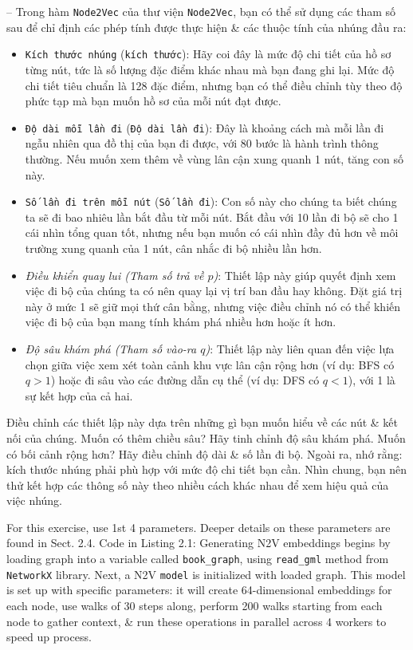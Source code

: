 \documentclass{article}
\begin{document}
\begin{itemize}
\begin{itemize}
\begin{itemize}
           -- Trong hàm {\tt Node2Vec} của thư viện {\tt Node2Vec}, bạn có thể sử dụng các tham số sau để chỉ định các phép tính được thực hiện \& các thuộc tính của nhúng đầu ra:
           \begin{itemize}
               \item {\tt Kích thước nhúng} ({\tt kích thước}): Hãy coi đây là mức độ chi tiết của hồ sơ từng nút, tức là số lượng đặc điểm khác nhau mà bạn đang ghi lại. Mức độ chi tiết tiêu chuẩn là 128 đặc điểm, nhưng bạn có thể điều chỉnh tùy theo độ phức tạp mà bạn muốn hồ sơ của mỗi nút đạt được.
               \item {\tt Độ dài mỗi lần đi} ({\tt Độ dài lần đi}): Đây là khoảng cách mà mỗi lần đi ngẫu nhiên qua đồ thị của bạn đi được, với 80 bước là hành trình thông thường. Nếu muốn xem thêm về vùng lân cận xung quanh 1 nút, tăng con số này.
               \item {\tt Số lần đi trên mỗi nút} ({\tt Số lần đi}): Con số này cho chúng ta biết chúng ta sẽ đi bao nhiêu lần bắt đầu từ mỗi nút. Bắt đầu với 10 lần đi bộ sẽ cho 1 cái nhìn tổng quan tốt, nhưng nếu bạn muốn có cái nhìn đầy đủ hơn về môi trường xung quanh của 1 nút, cân nhắc đi bộ nhiều lần hơn.
               \item {\it Điều khiển quay lui (Tham số trả về $p$)}: Thiết lập này giúp quyết định xem việc đi bộ của chúng ta có nên quay lại vị trí ban đầu hay không. Đặt giá trị này ở mức 1 sẽ giữ mọi thứ cân bằng, nhưng việc điều chỉnh nó có thể khiến việc đi bộ của bạn mang tính khám phá nhiều hơn hoặc ít hơn.
               \item {\it Độ sâu khám phá (Tham số vào-ra $q$)}: Thiết lập này liên quan đến việc lựa chọn giữa việc xem xét toàn cảnh khu vực lân cận rộng hơn (ví dụ: BFS có $q > 1$) hoặc đi sâu vào các đường dẫn cụ thể (ví dụ: DFS có $q < 1$), với 1 là sự kết hợp của cả hai.
           \end{itemize}
           Điều chỉnh các thiết lập này dựa trên những gì bạn muốn hiểu về các nút \& kết nối của chúng. Muốn có thêm chiều sâu? Hãy tinh chỉnh độ sâu khám phá. Muốn có bối cảnh rộng hơn? Hãy điều chỉnh độ dài \& số lần đi bộ. Ngoài ra, nhớ rằng: kích thước nhúng phải phù hợp với mức độ chi tiết bạn cần. Nhìn chung, bạn nên thử kết hợp các thông số này theo nhiều cách khác nhau để xem hiệu quả của việc nhúng.

           For this exercise, use 1st 4 parameters. Deeper details on these parameters are found in Sect. 2.4. Code in {\sf Listing 2.1: Generating N2V embeddings} begins by loading graph into a variable called \verb|book_graph|, using \verb|read_gml| method from {\tt NetworkX} library. Next, a N2V {\tt model} is initialized with loaded graph. This model is set up with specific parameters: it will create 64-dimensional embeddings for each node, use walks of 30 steps along, perform 200 walks starting from each node to gather context, \& run these operations in parallel across 4 workers to speed up process.


\end{itemize}
\end{itemize}
\end{itemize}
\end{document}
